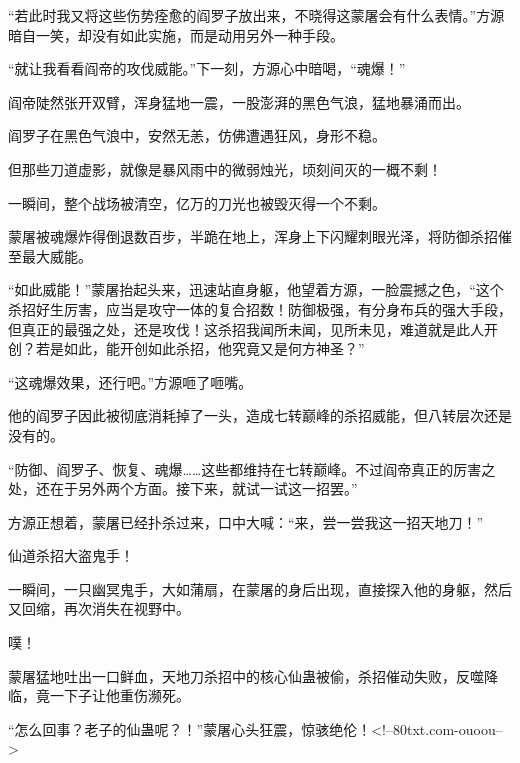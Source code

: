\begin{this_body}
“若此时我又将这些伤势痊愈的阎罗子放出来，不晓得这蒙屠会有什么表情。”方源暗自一笑，却没有如此实施，而是动用另外一种手段。

“就让我看看阎帝的攻伐威能。”下一刻，方源心中暗喝，“魂爆！”

阎帝陡然张开双臂，浑身猛地一震，一股澎湃的黑色气浪，猛地暴涌而出。

阎罗子在黑色气浪中，安然无恙，仿佛遭遇狂风，身形不稳。

但那些刀道虚影，就像是暴风雨中的微弱烛光，顷刻间灭的一概不剩！

一瞬间，整个战场被清空，亿万的刀光也被毁灭得一个不剩。

蒙屠被魂爆炸得倒退数百步，半跪在地上，浑身上下闪耀刺眼光泽，将防御杀招催至最大威能。

“如此威能！”蒙屠抬起头来，迅速站直身躯，他望着方源，一脸震撼之色，“这个杀招好生厉害，应当是攻守一体的复合招数！防御极强，有分身布兵的强大手段，但真正的最强之处，还是攻伐！这杀招我闻所未闻，见所未见，难道就是此人开创？若是如此，能开创如此杀招，他究竟又是何方神圣？”

“这魂爆效果，还行吧。”方源咂了咂嘴。

他的阎罗子因此被彻底消耗掉了一头，造成七转巅峰的杀招威能，但八转层次还是没有的。

“防御、阎罗子、恢复、魂爆……这些都维持在七转巅峰。不过阎帝真正的厉害之处，还在于另外两个方面。接下来，就试一试这一招罢。”

方源正想着，蒙屠已经扑杀过来，口中大喊：“来，尝一尝我这一招天地刀！”

仙道杀招大盗鬼手！

一瞬间，一只幽冥鬼手，大如蒲扇，在蒙屠的身后出现，直接探入他的身躯，然后又回缩，再次消失在视野中。

噗！

蒙屠猛地吐出一口鲜血，天地刀杀招中的核心仙蛊被偷，杀招催动失败，反噬降临，竟一下子让他重伤濒死。

“怎么回事？老子的仙蛊呢？！”蒙屠心头狂震，惊骇绝伦！<!--80txt.com-ouoou-->

\end{this_body}

